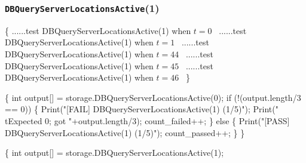 \documentclass{article}
\def\nwendcode{\endtrivlist \endgroup}
\let\nwdocspar=\par
\begin{document}
\subsubsection{{\tt{}DBQueryServerLocationsActive}(1)}
\nwenddocs{}\endmoddef{}
\{
  \LA{}......test \code{}DBQueryServerLocationsActive\edoc{}(1) when $t=0$~{\nwtagstyle{}}\RA{}
  \LA{}......test \code{}DBQueryServerLocationsActive\edoc{}(1) when $t=1$~{\nwtagstyle{}}\RA{}
  \LA{}......test \code{}DBQueryServerLocationsActive\edoc{}(1) when $t=44$~{\nwtagstyle{}}\RA{}
  \LA{}......test \code{}DBQueryServerLocationsActive\edoc{}(1) when $t=45$~{\nwtagstyle{}}\RA{}
  \LA{}......test \code{}DBQueryServerLocationsActive\edoc{}(1) when $t=46$~{\nwtagstyle{}}\RA{}
\}
\nwendcode{}\nwdocspar
\nwenddocs{}\endmoddef{}
\{
  int output[] = storage.DBQueryServerLocationsActive(0);
  if (!(output.length/3 == 0)) \{
    Print("[FAIL] DBQueryServerLocationsActive(1) (1/5)");
    Print("\\tExpected 0; got "+output.length/3);
    count_failed++;
  \} else \{
    Print("[PASS] DBQueryServerLocationsActive(1) (1/5)");
    count_passed++;
  \}
\}
\nwendcode{}\nwdocspar
\nwenddocs{}\endmoddef{}
\{
  int output[] = storage.DBQueryServerLocationsActive(1);
\end{document}
